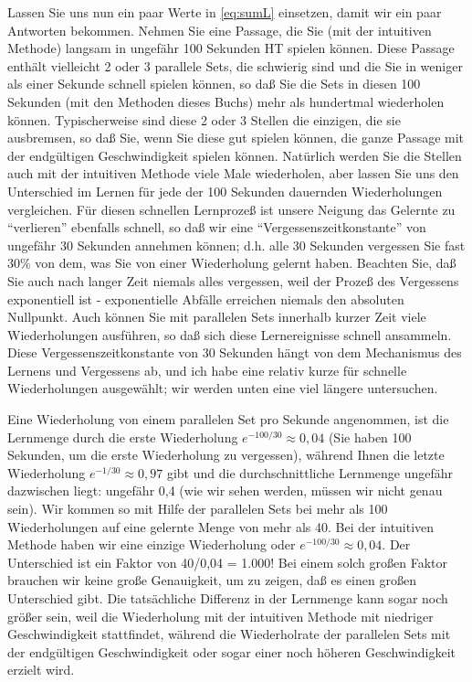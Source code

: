 Lassen Sie uns nun ein paar Werte in \autoref{eq:sumL} einsetzen, damit wir ein paar Antworten bekommen.
Nehmen Sie eine Passage, die Sie (mit der intuitiven Methode) langsam in ungefähr 100 Sekunden HT spielen können.
Diese Passage enthält vielleicht 2 oder 3 parallele Sets, die schwierig sind und die Sie in weniger als einer Sekunde schnell spielen können, so daß Sie die Sets in diesen 100 Sekunden (mit den Methoden dieses Buchs) mehr als hundertmal wiederholen können.
Typischerweise sind diese 2 oder 3 Stellen die einzigen, die sie ausbremsen, so daß Sie, wenn Sie diese gut spielen können, die ganze Passage mit der endgültigen Geschwindigkeit spielen können.
Natürlich werden Sie die Stellen auch mit der intuitiven Methode viele Male wiederholen, aber lassen Sie uns den Unterschied im Lernen für jede der 100 Sekunden dauernden Wiederholungen vergleichen.
Für diesen schnellen Lernprozeß ist unsere Neigung das Gelernte zu \enquote{verlieren} ebenfalls schnell, so daß wir eine \enquote{Vergessenszeitkonstante} von ungefähr 30 Sekunden annehmen können; d.h. alle 30 Sekunden vergessen Sie fast 30\% von dem, was Sie von einer Wiederholung gelernt haben.
Beachten Sie, daß Sie auch nach langer Zeit niemals alles vergessen, weil der Prozeß des Vergessens exponentiell ist - exponentielle Abfälle erreichen niemals den absoluten Nullpunkt.
Auch können Sie mit parallelen Sets innerhalb kurzer Zeit viele Wiederholungen ausführen, so daß sich diese Lernereignisse schnell ansammeln.
Diese Vergessenszeitkonstante von 30 Sekunden hängt von dem Mechanismus des Lernens und Vergessens ab, und ich habe eine relativ kurze für schnelle Wiederholungen ausgewählt; wir werden unten eine viel längere untersuchen.

Eine Wiederholung von einem parallelen Set pro Sekunde angenommen, ist die Lernmenge durch die erste Wiederholung $e^{-100/30} \approx 0,04$ (Sie haben 100 Sekunden, um die erste Wiederholung zu vergessen), während Ihnen die letzte Wiederholung $e^{-1/30} \approx 0,97$ gibt und die durchschnittliche Lernmenge ungefähr dazwischen liegt: ungefähr 0,4 (wie wir sehen werden, müssen wir nicht genau sein). Wir kommen so mit Hilfe der parallelen Sets bei mehr als 100 Wiederholungen auf eine gelernte Menge von mehr als 40.
Bei der intuitiven Methode haben wir eine einzige Wiederholung oder $e^{-100/30} \approx 0,04$.
Der Unterschied ist ein Faktor von 40/0,04 = 1.000!
Bei einem solch großen Faktor brauchen wir keine große Genauigkeit, um zu zeigen, daß es einen großen Unterschied gibt.
Die tatsächliche Differenz in der Lernmenge kann sogar noch größer sein, weil die Wiederholung mit der intuitiven Methode mit niedriger Geschwindigkeit stattfindet, während die Wiederholrate der parallelen Sets mit der endgültigen Geschwindigkeit oder sogar einer noch höheren Geschwindigkeit erzielt wird.

